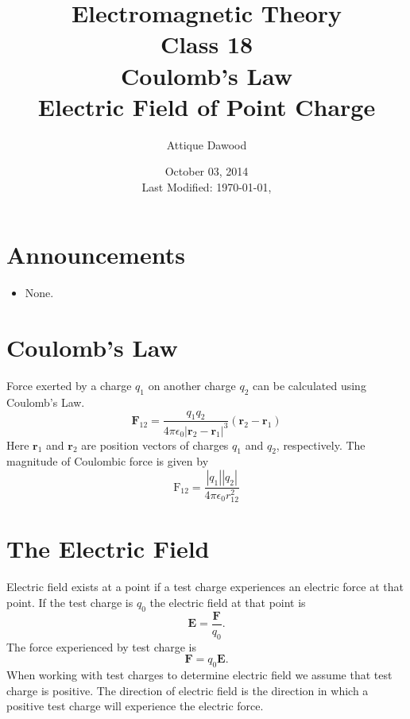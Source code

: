 \documentclass[12pt,a4paper]{article}
\title{Electromagnetic Theory\\Class 18\\Coulomb's Law\\Electric Field of Point Charge}
\author{Attique Dawood}
\date{October 03, 2014\\[0.2cm] Last Modified: \today, \currenttime}
\begin{document}
\maketitle
\section{Announcements}
\begin{itemize}
\item None.
\end{itemize}
\section{Coulomb's Law}
Force exerted by a charge $q_1$ on another charge $q_2$ can be calculated using Coulomb's Law.
\begin{equation}
\textbf{F}_{12}=\dfrac{q_1q_2}{4\pi\epsilon_0 |\textbf{r}_2-\textbf{r}_1|^3}(\textbf{r}_2-\textbf{r}_1)
\end{equation}
Here $\textbf{r}_1$ and $\textbf{r}_2$ are position vectors of charges $q_1$ and $q_2$, respectively.
The magnitude of Coulombic force is given by
\begin{equation}
\mathrm{F}_{12}=\dfrac{|q_1||q_2|}{4\pi\epsilon_0r_{12}^2}
\end{equation}
\section{The Electric Field}
Electric field exists at a point if a test charge experiences an electric force at that point. If the test charge is $q_0$ the electric field at that point is
\begin{equation}
\textbf{E}=\dfrac{\textbf{F}}{q_0}.
\end{equation}
The force experienced by test charge is
\begin{equation}
\textbf{F}=q_0\textbf{E}.
\end{equation}
When working with test charges to determine electric field we assume that test charge is positive. The direction of electric field is the direction in which a positive test charge will experience the electric force.
\end{document}
